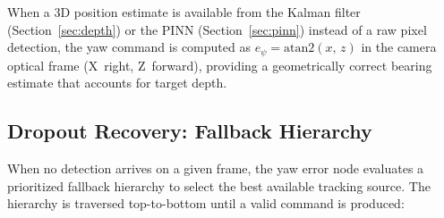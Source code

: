 \documentclass[11pt,letterpaper]{article}
\begin{document}
When a 3D position estimate is available from the Kalman filter
(Section~\ref{sec:depth}) or the PINN (Section~\ref{sec:pinn}) instead
of a raw pixel detection, the yaw command is computed as
$e_{\psi} = \mathrm{atan2}(x,\,z)$ in the camera optical frame
(X~right, Z~forward), providing a geometrically correct bearing
estimate that accounts for target depth.

\subsection{Dropout Recovery: Fallback Hierarchy}
\label{sec:fallback}

When no detection arrives on a given frame, the yaw error node evaluates
a prioritized fallback hierarchy to select the best available tracking
source.  The hierarchy is traversed top-to-bottom until a valid command
is produced:
\end{document}
